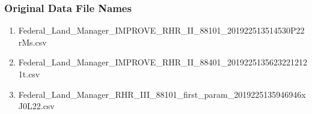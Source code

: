 








\subsubsection*{Original Data File Names}

\begin{enumerate}[noitemsep]
\item Federal\_Land\_Manager\_IMPROVE\_RHR\_II\_88101\_201922513514530P22rMs.csv %
\item Federal\_Land\_Manager\_IMPROVE\_RHR\_II\_88401\_20192251356232212121t.csv  %
\item  Federal\_Land\_Manager\_RHR\_III\_88101\_first\_param\_2019225135946946xJ0L22.csv  %


\end{enumerate}

